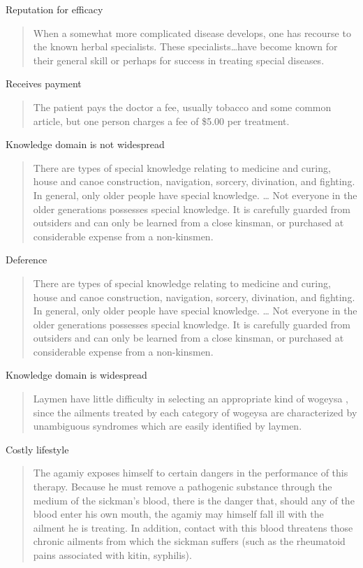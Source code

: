 \documentclass[
]{article}
\begin{document}
Reputation for efficacy

\begin{quote}
When a somewhat more complicated disease develops, one has recourse to the known herbal specialists. These specialists\ldots have become known for their general skill or perhaps for success in treating special diseases.
\end{quote}

Receives payment

\begin{quote}
The patient pays the doctor a fee, usually tobacco and some common article, but one person charges a fee of \$5.00 per treatment.
\end{quote}

Knowledge domain is not widespread

\begin{quote}
There are types of special knowledge relating to medicine and curing, house and canoe construction, navigation, sorcery, divination, and fighting. In general, only older people have special knowledge. \ldots{} Not everyone in the older generations possesses special knowledge. It is carefully guarded from outsiders and can only be learned from a close kinsman, or purchased at considerable expense from a non-kinsmen.
\end{quote}

Deference

\begin{quote}
There are types of special knowledge relating to medicine and curing, house and canoe construction, navigation, sorcery, divination, and fighting. In general, only older people have special knowledge. \ldots{} Not everyone in the older generations possesses special knowledge. It is carefully guarded from outsiders and can only be learned from a close kinsman, or purchased at considerable expense from a non-kinsmen.
\end{quote}

Knowledge domain is widespread

\begin{quote}
Laymen have little difficulty in selecting an appropriate kind of wogeysa , since the ailments treated by each category of wogeysa are characterized by unambiguous syndromes which are easily identified by laymen.
\end{quote}

Costly lifestyle

\begin{quote}
The agamiy exposes himself to certain dangers in the performance of this therapy. Because he must remove a pathogenic substance through the medium of the sickman's blood, there is the danger that, should any of the blood enter his own mouth, the agamiy may himself fall ill with the ailment he is treating. In addition, contact with this blood threatens those chronic ailments from which the sickman suffers (such as the rheumatoid pains associated with kitin, syphilis).
\end{quote}
\end{document}
